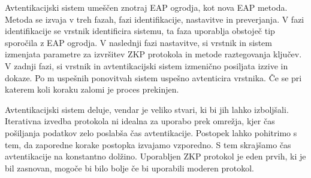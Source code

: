 %
Avtentikacijski sistem umeščen znotraj EAP ogrodja, kot nova EAP metoda.
Metoda se izvaja v treh fazah, fazi identifikacije, nastavitve in preverjanja.
V fazi identifikacije se vrstnik identificira sistemu, ta faza uporablja obstoječ tip sporočila z EAP ogrodja.
V naslednji fazi nastavitve, si vrstnik in sistem izmenjata parametre za izvršitev ZKP protokola in metode raztegovanja ključev.
V zadnji fazi, si vrstnik in avtentikacijski sistem izmenično posiljata izzive in dokaze. Po m uspešnih ponovitvah sistem uspešno avtenticira vrstnika. 
Če se pri katerem koli koraku zalomi je proces prekinjen.

%

Avtentikacijski sistem deluje, vendar je veliko stvari, ki bi jih lahko izboljšali.
Iterativna izvedba protokola ni idealna za uporabo prek omrežja, kjer čas pošiljanja podatkov zelo poslabša čas avtentikacije.
Postopek lahko pohitrimo s tem, da zaporedne korake postopka izvajamo vzporedno. S tem skrajšamo čas avtentikacije na konstantno dolžino.
Uporabljen ZKP protokol je eden prvih, ki je bil zasnovan, mogoče bi bilo bolje če bi uporabili moderen protokol.







